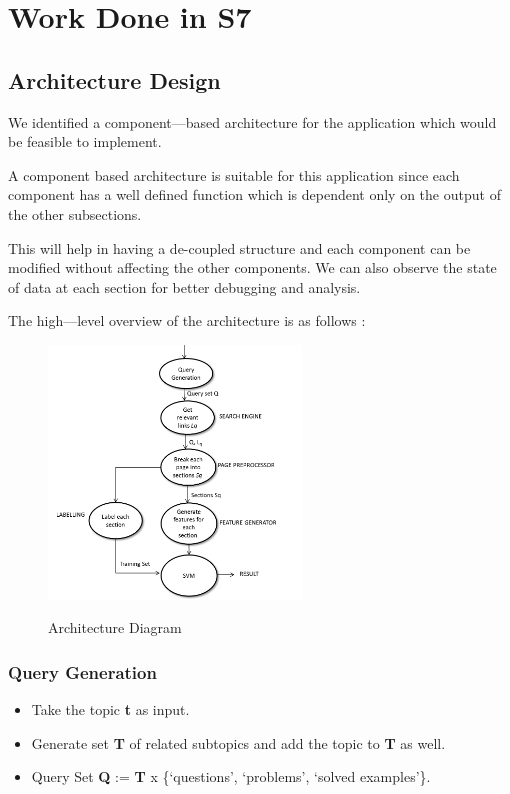 \documentclass[10pt,a4paper]{report}
\begin{document}

\chapter{Work Done in S7}

\section{Architecture Design}

We identified a component---based architecture for the application which would be feasible to implement. 

A component based architecture is suitable for this application since each component has a well defined function which is dependent only on the output of the other subsections.

This will help in having a de-coupled structure and each component can be modified without affecting the other components. We can also observe the state of data at each section for better debugging and analysis.

The high---level overview of the architecture is as follows : 

\begin{figure}[h!]
\centering
\includegraphics[width=0.6\textwidth]{./diagrams/architecture}\\
\caption{Architecture Diagram}
\end{figure}

\subsection{Query Generation}

\begin{itemize}

	\item Take the topic \textbf{t} as input.
	\item Generate set \textbf{T} of related subtopics and add the topic to \textbf{T} as well.
	\item Query Set \textbf{Q} := \textbf{T} x \{`questions', `problems', `solved examples'\}.

\end{itemize} 
\end{document}
